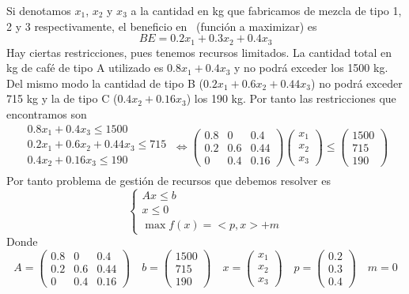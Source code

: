 \documentclass[a4]{article}
\begin{document}
Si denotamos $x_1$, $x_2$ y $x_3$ a la cantidad en kg que fabricamos
de mezcla de tipo 1, 2 y 3 respectivamente, el beneficio en \EUR\
(función a maximizar) es
\begin{equation} \label{eq:beneficio}
BE=0.2x_1+0.3x_2+0.4x_3
\end{equation}
Hay ciertas restricciones, pues tenemos recursos limitados. La
cantidad total en kg de café de tipo A utilizado es $0.8x_1+0.4x_3$ y
no podrá exceder los 1500 kg. Del mismo modo la cantidad de tipo B
($0.2x_1+0.6x_2+0.44x_3$) no podrá exceder 715 kg y la de tipo C
($0.4x_2+0.16x_3$) los 190 kg. Por tanto las restricciones que
encontramos son
\begin{equation} \label{eq:restricciones}
  \begin{split} 
  0.8x_1+0.4x_3 \leq 1500 \\
  0.2x_1+0.6x_2+0.44x_3 \leq 715 \\
  0.4x_2+0.16x_3 \leq 190 \\
\end{split} \ \Longleftrightarrow
\begin{pmatrix}
    0.8 & 0 & 0.4 \\
    0.2 & 0.6 & 0.44 \\
    0 & 0.4 & 0.16
  \end{pmatrix}
  \begin{pmatrix}
    x_1 \\ x_2 \\ x_3
  \end{pmatrix} \leq
  \begin{pmatrix}
    1500 \\ 715 \\ 190
  \end{pmatrix}
\end{equation}
Por tanto problema de gestión de recursos que debemos resolver es
\begin{equation} \label{eq:prob-recursos}
  \begin{cases}
    Ax\leq b \\
    x\leq 0 \\
    \max f(x)=<p,x>+m
  \end{cases}
\end{equation}
Donde
\[A=\begin{pmatrix}
    0.8 & 0 & 0.4 \\
    0.2 & 0.6 & 0.44 \\
    0 & 0.4 & 0.16
  \end{pmatrix}\quad b=\begin{pmatrix}
    1500 \\ 715 \\ 190
  \end{pmatrix}\quad x=\begin{pmatrix}
    x_1 \\ x_2 \\ x_3
  \end{pmatrix}\quad p=\begin{pmatrix}
    0.2 \\ 0.3 \\ 0.4
  \end{pmatrix}\quad m=0
\]
\end{document}
